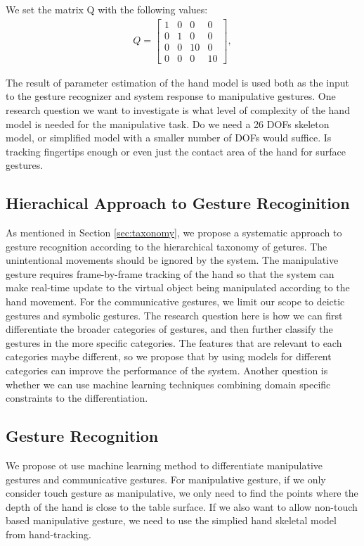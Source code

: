We set the matrix Q with the following values:
\begin{align*}
Q = \left[ \begin{array}{cccc}
	1 & 0 & 0 & 0 \\
	0 & 1 & 0 & 0 \\
	0 & 0 & 10 & 0 \\
	0 & 0 & 0 & 10 \end{array} \right],
\end{align*}
  
The result of parameter estimation of the hand model is used both as the input
to the gesture recognizer and system response to manipulative gestures. One
research question we want to investigate is what level of complexity of the
hand model is needed for the manipulative task. Do we need a 26 DOFs skeleton
model, or simplified model with a smaller number of DOFs would suffice. Is
tracking fingertips enough or even just the contact area of the hand for surface
gestures.

\subsection{Hierachical Approach to Gesture Recoginition}
As mentioned in Section \ref{sec:taxonomy}, we propose a systematic approach to
gesture recognition according to the hierarchical taxonomy of getures. The
unintentional movements should be ignored by the system. The manipulative
gesture requires frame-by-frame tracking of the hand so that the system can make
real-time update to the virtual object being manipulated according to the hand
movement. For the communicative gestures, we limit our scope to deictic gestures
and symbolic gestures. The research question here is how we can first
differentiate the broader categories of gestures, and then further classify the
gestures in the more specific categories. The features that are relevant to each
categories maybe different, so we propose that by using models for different
categories can improve the performance of the system. Another question is
whether we can use machine learning techniques combining domain specific
constraints to the differentiation.

\subsection{Gesture Recognition}
We propose ot use machine learning method to differentiate
manipulative gestures and communicative gestures. For manipulative gesture, if
we only consider touch gesture as manipulative, we only need to find the points
where the depth of the hand is close to the table surface. If we also want to
allow non-touch based manipulative gesture, we need to use the simplied hand
skeletal model from hand-tracking. 

